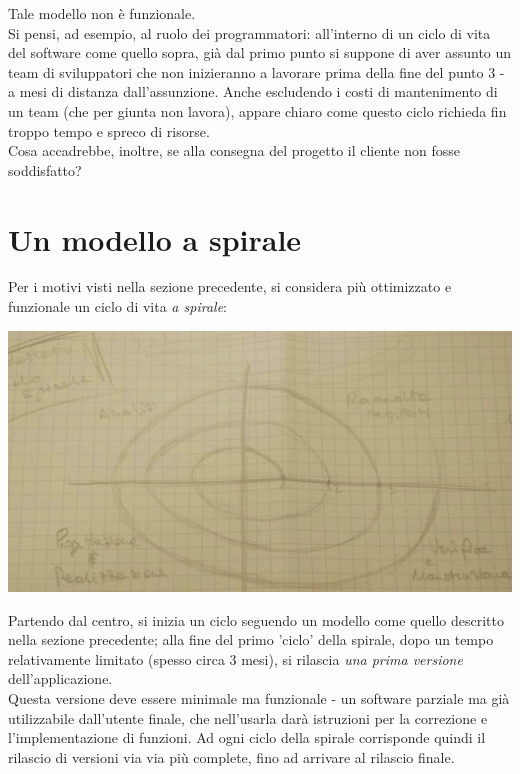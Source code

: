Tale modello non è funzionale.\\
Si pensi, ad esempio, al ruolo dei programmatori: all'interno di un ciclo di vita del software come quello sopra, già dal primo punto si suppone di aver assunto un team di sviluppatori che non inizieranno a lavorare prima della fine del punto 3 - a mesi di distanza dall'assunzione. Anche escludendo i costi di mantenimento di un team (che per giunta non lavora), appare chiaro come questo ciclo richieda fin troppo tempo e spreco di risorse.\\
Cosa accadrebbe, inoltre, se alla consegna del progetto il cliente non fosse soddisfatto?

\section{Un modello a spirale}
Per i motivi visti nella sezione precedente, si considera più ottimizzato e funzionale un ciclo di vita \textit{a spirale}:
\begin{center}
    \includegraphics[width=.5\textwidth]{spiral.jpg} \hfill
\end{center}
\newpage

Partendo dal centro, si inizia un ciclo seguendo un modello come quello descritto nella sezione precedente; alla fine del primo 'ciclo' della spirale, dopo un tempo relativamente limitato (spesso circa 3 mesi), si rilascia \textit{una prima \textit{}versione} dell'applicazione.\\
Questa versione deve essere minimale ma funzionale - un software parziale ma già utilizzabile dall'utente finale, che nell'usarla darà istruzioni per la correzione e l'implementazione di funzioni. Ad ogni ciclo della spirale corrisponde quindi il rilascio di versioni via via più complete, fino ad arrivare al rilascio finale.

